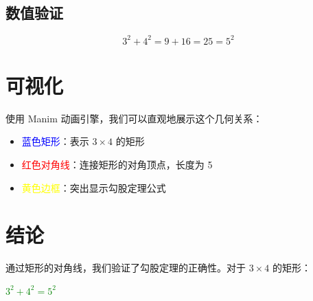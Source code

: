 \documentclass[12pt]{article}
\begin{document}
\subsection{数值验证}

\begin{equation}
3^2 + 4^2 = 9 + 16 = 25 = 5^2
\end{equation}

\section{可视化}

使用 Manim 动画引擎，我们可以直观地展示这个几何关系：

\begin{itemize}
    \item \textcolor{blue}{蓝色矩形}：表示 $3 \times 4$ 的矩形
    \item \textcolor{red}{红色对角线}：连接矩形的对角顶点，长度为 5
    \item \textcolor{yellow}{黄色边框}：突出显示勾股定理公式
\end{itemize}

\section{结论}

通过矩形的对角线，我们验证了勾股定理的正确性。对于 $3 \times 4$ 的矩形：

\begin{center}
\Large \textcolor{green}{$\boxed{3^2 + 4^2 = 5^2}$}
\end{center}
\end{document}
